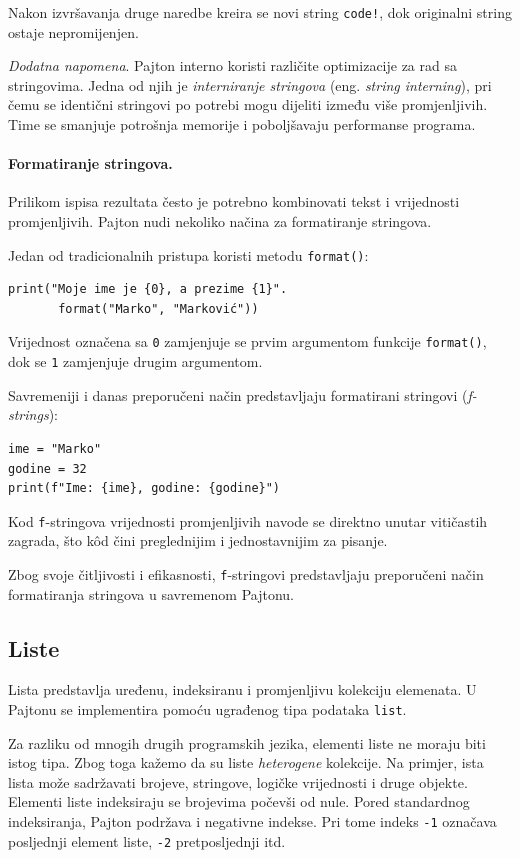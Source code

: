 Nakon izvršavanja druge naredbe kreira se novi string \texttt{code!}, dok originalni string ostaje nepromijenjen.

\textit{Dodatna napomena}. Pajton interno koristi različite optimizacije za rad sa stringovima. Jedna od njih je \textit{interniranje stringova} (eng. \textit{string interning}), pri čemu se identični stringovi po potrebi mogu dijeliti između više promjenljivih. Time se smanjuje potrošnja memorije i poboljšavaju performanse programa.

\paragraph{Formatiranje stringova.} Prilikom ispisa rezultata često je potrebno kombinovati tekst i vrijednosti promjenljivih. Pajton nudi nekoliko načina za formatiranje stringova.

Jedan od tradicionalnih pristupa koristi metodu \texttt{format()}:

\begin{verbatim}
print("Moje ime je {0}, a prezime {1}".
       format("Marko", "Marković"))
\end{verbatim}

Vrijednost označena sa \texttt{{0}} zamjenjuje se prvim argumentom funkcije \texttt{format()}, dok se \texttt{{1}} zamjenjuje drugim argumentom.

Savremeniji i danas preporučeni način predstavljaju formatirani stringovi (\textit{f-strings}):

\begin{verbatim}
ime = "Marko"
godine = 32
print(f"Ime: {ime}, godine: {godine}")
\end{verbatim}

Kod \texttt{f}-stringova vrijednosti promjenljivih navode se direktno unutar vitičastih zagrada, što k\^od čini preglednijim i jednostavnijim za pisanje.

Zbog svoje čitljivosti i efikasnosti, \texttt{f}-stringovi predstavljaju preporučeni način formatiranja stringova u savremenom Pajtonu.


\subsection{Liste}

Lista predstavlja uređenu, indeksiranu i promjenljivu kolekciju elemenata. U Pajtonu se implementira pomoću ugrađenog tipa podataka \texttt{list}.

Za razliku od mnogih drugih programskih jezika, elementi liste ne moraju biti istog tipa. Zbog toga kažemo da su liste \textit{heterogene} kolekcije. Na primjer, ista lista može sadržavati brojeve, stringove, logičke vrijednosti i druge objekte.  Elementi liste indeksiraju se brojevima počevši od nule. Pored standardnog indeksiranja, Pajton podržava i negativne indekse. Pri tome indeks \texttt{-1} označava posljednji element liste, \texttt{-2} pretposljednji itd.

